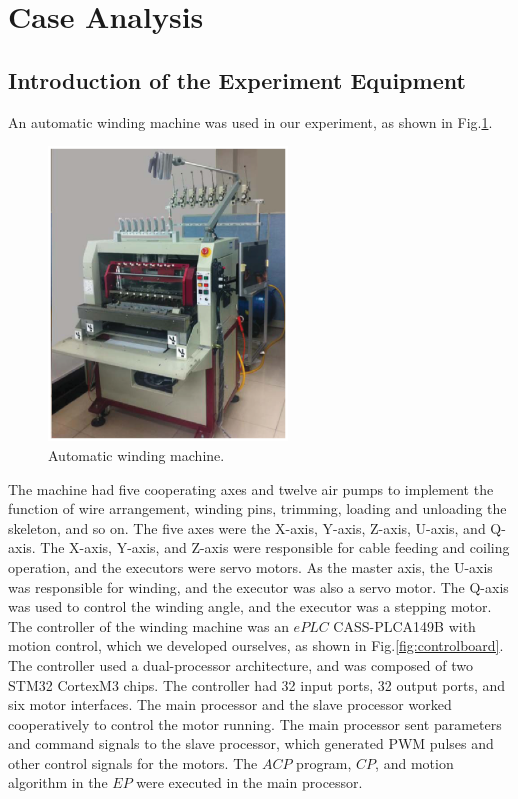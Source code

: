 \documentclass[journal]{IEEEtran}
\begin{document}
\section{Case Analysis}
\label{Case-Analysis}


\subsection{Introduction of the Experiment Equipment}
An automatic winding machine was used in our experiment, as shown in Fig.\ref{fig:machine}.
\begin{figure}
	\centering
	\includegraphics[width=2.5in]{fig/FIG14_TII-18-0024.eps}
	\caption{Automatic winding machine.}
	\label{fig:machine}
\end{figure}
The machine had five cooperating axes and twelve air pumps to implement the function of wire arrangement, winding pins, trimming, loading and unloading the skeleton, and so on. The five axes were the X-axis, Y-axis, Z-axis, U-axis, and Q-axis. The X-axis, Y-axis, and Z-axis were responsible for cable feeding and coiling operation, and the executors were servo motors. As the master axis, the U-axis was responsible for winding, and the executor was also a servo motor. The Q-axis was used to control the winding angle, and the executor was a stepping motor.
The controller of the winding machine was an $ePLC$ CASS-PLCA149B with motion control, which we developed ourselves, as shown in Fig.\ref{fig:controlboard}. The controller used a dual-processor architecture, and was composed of two STM32 CortexM3 chips. The controller had 32 input ports, 32 output ports, and six motor interfaces. The main processor and the slave processor worked cooperatively to control the motor running. The main processor sent parameters and command signals to the slave processor, which generated PWM pulses and other control signals for the motors. The $ACP$ program, $CP$, and motion algorithm in the $EP$ were executed in the main processor.
\end{document}
